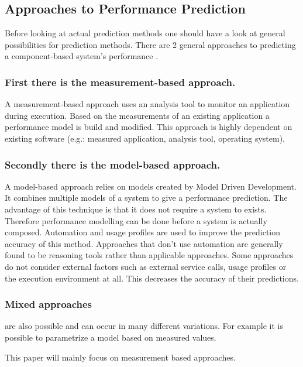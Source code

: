 \subsection{Approaches to Performance Prediction}\label{sec:approachesPerformanceLearning}

Before looking at actual prediction methods one should have a look at general possibilities for prediction methods. There are 2 general approaches to predicting a component-based system's performance \cite{ComparativeanalysisAbdelaziz112011}. 

\subsubsection[Measurement Approach]{\textnormal{First there is the }measurement-based approach\textnormal{.}} A measurement-based approach uses an analysis tool to monitor an application during execution. Based on the measurements of an existing application a performance model is build and modified. This approach is highly dependent on existing software (e.g.: measured application, analysis tool, operating system). \cite{ComparativeanalysisAbdelaziz112011}

\subsubsection[Model-based Approach]{\textnormal{Secondly there is the }model-based approach\textnormal{.}}
A model-based approach relies on models created by Model Driven Development. It combines multiple models of a system to give a performance prediction. The advantage of this technique is that it does not require a system to exists. Therefore performance modelling can be done before a system is actually composed.
Automation and usage profiles are used to improve the prediction accuracy of this method. Approaches that don't use automation are generally found to be reasoning tools rather than applicable approaches. Some approaches do not consider external factors such as external service calls, usage profiles or the execution environment at all. This decreases the accuracy of their predictions. \cite{ComparativeanalysisAbdelaziz112011}

\subsubsection[Mixed Approaches]{Mixed approaches} are also possible and can occur in many different variations. For example it is possible to parametrize a model based on measured values. \cite{ComparativeanalysisAbdelaziz112011}

This paper will mainly focus on measurement based approaches.%



